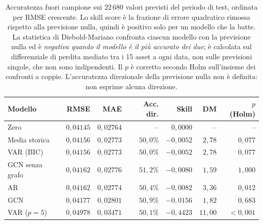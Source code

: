 \begin{table}[H]
\centering
\caption[Confronto predittivo tra i modelli]{Accuratezza fuori campione sui $22\,680$ valori previsti del periodo di test, ordinata per RMSE crescente. Lo skill score è la frazione di errore quadratico rimossa rispetto alla previsione nulla, quindi è positivo solo per un modello che la batte. La statistica di Diebold-Mariano confronta ciascun modello con la previsione nulla ed è \emph{negativa quando il modello è il più accurato dei due}; è calcolata sul differenziale di perdita mediato tra i 15 asset a ogni data, non sulle previsioni singole, che non sono indipendenti. Il $p$ è corretto secondo Holm sull'insieme dei confronti a coppie. L'accuratezza direzionale della previsione nulla non è definita: non esprime alcuna direzione.}
\label{tab:results-main}
\small
\begin{tabular}{@{}lrrrrrr@{}}
\toprule
\textbf{Modello} & \textbf{RMSE} & \textbf{MAE} & \textbf{Acc. dir.} & \textbf{Skill} & \textbf{DM} & \textbf{$p$ (Holm)} \\
\midrule
Zero & $0{,}04145$ & $0{,}02764$ & -- & $0{,}0000$ & -- & -- \\
Media storica & $0{,}04156$ & $0{,}02773$ & $50{,}0\%$ & $-0{,}0052$ & $2{,}78$ & $0{,}077$ \\
VAR (BIC) & $0{,}04156$ & $0{,}02773$ & $50{,}0\%$ & $-0{,}0052$ & $2{,}78$ & $0{,}077$ \\
GCN senza grafo & $0{,}04162$ & $0{,}02776$ & $51{,}2\%$ & $-0{,}0080$ & $1{,}59$ & $1{,}000$ \\
AR & $0{,}04162$ & $0{,}02774$ & $50{,}4\%$ & $-0{,}0082$ & $3{,}36$ & $0{,}012$ \\
GCN & $0{,}04177$ & $0{,}02801$ & $50{,}9\%$ & $-0{,}0156$ & $1{,}82$ & $0{,}683$ \\
VAR ($p=5$) & $0{,}04978$ & $0{,}03471$ & $50{,}1\%$ & $-0{,}4423$ & $11{,}00$ & $<0{,}001$ \\
\bottomrule
\end{tabular}
\end{table}
